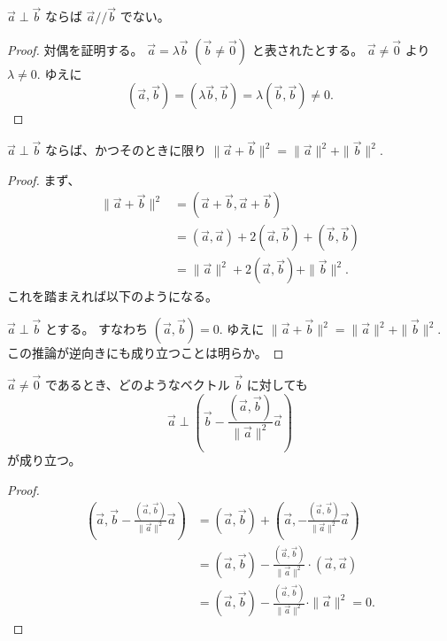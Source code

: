 \begin{thm}
  \(\vec{a}\perp\vec{b}\) ならば \(\vec{a}/\!/\vec{b}\) でない。
\end{thm}

\begin{proof}
  対偶を証明する。
  \(\vec{a}=\lambda\vec{b}\) \((\vec{b}\neq\vec{0})\) と表されたとする。
  \(\vec{a}\neq\vec{0}\) より \(\lambda\neq0.\)
  ゆえに
  \[(\vec{a},\vec{b})=(\lambda\vec{b},\vec{b})=\lambda(\vec{b},\vec{b})\neq0.\]
\end{proof}

\begin{thm}\label{251101144501}
  \(\vec{a}\perp\vec{b}\) ならば、かつそのときに限り \(\|\vec{a}+\vec{b}\|^2=\|\vec{a}\|^2+\|\vec{b}\|^2.\)
\end{thm}

\begin{proof}
  まず、
  \begin{align*}
    \|\vec{a}+\vec{b}\|^2 &= (\vec{a}+\vec{b},\vec{a}+\vec{b}) \\
                          &= (\vec{a},\vec{a})+2(\vec{a},\vec{b})+(\vec{b},\vec{b}) \\
                          &= \|\vec{a}\|^2+2(\vec{a},\vec{b})+\|\vec{b}\|^2.
  \end{align*}
  これを踏まえれば以下のようになる。

  \(\vec{a}\perp\vec{b}\) とする。
  すなわち \((\vec{a},\vec{b})=0.\)
  ゆえに \(\|\vec{a}+\vec{b}\|^2=\|\vec{a}\|^2+\|\vec{b}\|^2.
  \) この推論が逆向きにも成り立つことは明らか。
\end{proof}

\begin{thm}\label{251101141501}
  \(\vec{a}\neq\vec{0}\) であるとき、どのようなベクトル \(\vec{b}\) に対しても
  \[\vec{a}\perp\left(\vec{b}-\frac{(\vec{a},\vec{b})}{\|\vec{a}\|^2}\vec{a}\right)\]
  が成り立つ。
\end{thm}

\begin{proof}
  \begin{align*}
    \left(\vec{a},\vec{b}-\frac{(\vec{a},\vec{b})}{\|\vec{a}\|^2}\vec{a}\right) &= (\vec{a},\vec{b})+\left(\vec{a},-\frac{(\vec{a},\vec{b})}{\|\vec{a}\|^2}\vec{a}\right) \\
                                                                                &= (\vec{a},\vec{b})-\frac{(\vec{a},\vec{b})}{\|\vec{a}\|^2}\cdot(\vec{a},\vec{a}) \\
                                                                                &= (\vec{a},\vec{b})-\frac{(\vec{a},\vec{b})}{\|\vec{a}\|^2}\cdot\|\vec{a}\|^2=0.
  \end{align*}
\end{proof}

